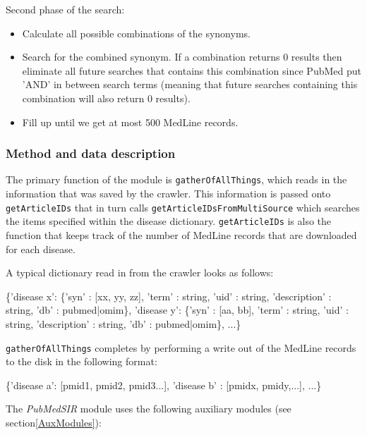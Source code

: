 Second phase of the search:
\begin{itemize}

\item Calculate all possible combinations of the synonyms.

\item Search for the combined synonym. If a combination returns 0
  results then eliminate all future searches that contains this
  combination since PubMed put 'AND' in between search terms (meaning
  that future searches containing this combination will also return 0
  results).

\item Fill up until we get at most 500 MedLine records.

\end{itemize}

\subsubsection{Method and data description}
The primary function of the module is \texttt{gatherOfAllThings},
which reads in the information that was saved by the crawler. This
information is passed onto \texttt{getArticleIDs} that in turn calls
\texttt{getArticleIDsFromMultiSource} which searches the items
specified within the disease dictionary. \texttt{getArticleIDs} is
also the function that keeps track of the number of MedLine records
that are downloaded for each disease.

A typical dictionary read in from the crawler looks as follows:

\begin{center}
{\small
\{'disease x': \{'syn' : [xx, yy, zz], 'term' : string, 'uid' : string,
    'description' : string, 'db' : pubmed|omim\}, 'disease y': \{'syn' :
    [aa, bb], 'term' : string, 'uid' : string, 'description' : string,
    'db' : pubmed|omim\}, ...\}
}
\end{center}

\texttt{gatherOfAllThings} completes by performing a write out of the
MedLine records to the disk in the following format:

\begin{center}
{\small
\{'disease a': [pmid1, pmid2, pmid3...], 'disease b' : [pmidx,
    pmidy,...], ...\}
}
\end{center}

The \textit{PubMedSIR} module uses the following auxiliary modules
(see section\ref{AuxModules}):


